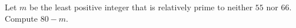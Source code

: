 Let $m$ be the least positive integer that is relatively prime to neither $55$ nor $66$. Compute $80-m$.
